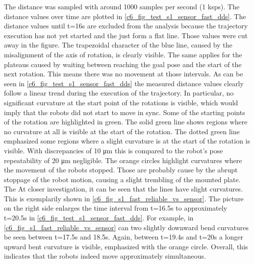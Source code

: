 The distance was sampled with around 1000 samples per second (1 \si{ksps}). The distance values over time are plotted in \autoref{c6_fig_test_s1_sensor_fast_dds}. The distance values until t=16s are excluded from the analysis because the trajectory execution has not yet started and the just form a flat line. Those values were cut away in the figure. The trapezoidal character of the blue line, caused by the misalignment of the axis of rotation, is clearly visible. The same applies for the plateaus caused by waiting between reaching the goal pose and the start of the next rotation. This means there was no movement at those intervals. As can be seen in \autoref{c6_fig_test_s1_sensor_fast_dds} the measured distance values clearly follow a linear trend during the execution of the trajectory. In particular, no significant curvature at the start point of the rotations is visible, which would imply that the robots did not start to move in sync. Some of the starting points of the rotation are highlighted in green. The solid green line shows regions where no curvature at all is visible at the start of the rotation. The dotted green line emphasized some regions where a slight curvature is at the start of the rotation is visible. With discrepancies of 10 \si{\micro\meter} this is compared to the robot's pose repeatability of 20 \si{\micro\meter} negligible. The orange circles highlight curvatures where the movement of the robots stopped. Those are probably cause by the abrupt stoppage of the robot motion, causing a slight trembling of the mounted plate.\newline
The At closer investigation, it can be seen that the lines have slight curvatures. This is exemplarily shown in \autoref{c6_fig_s1_fast_reliable_vs_sensor}. The picture on the right side enlarges the time interval from  t=16.5s to approximately t=20.5s in \autoref{c6_fig_test_s1_sensor_fast_dds}. For example, in \autoref{c6_fig_s1_fast_reliable_vs_sensor} can two slightly downward bend curvatures be seen between t=17.5s and 18.5s. Again, between t=19.4s and t=20s a longer upward bent curvature is visible, emphasized with the orange circle. Overall, this indicates that the robots indeed move approximately simultaneous. 

